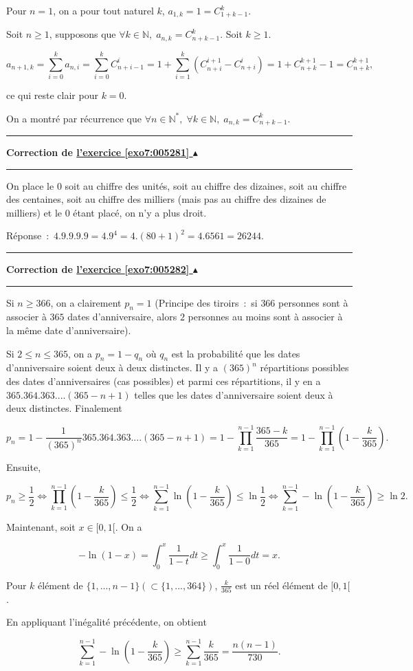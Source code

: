 \documentclass[11pt,a4paper]{article}
\newcommand{\Nn}{\mathbb{N}} \newcommand{\N}{\mathbb{N}}
\newcounter{exo}
\newcommand{\correction}[1]{\hypertarget{cor7:#1}{}\label{cor7:#1}{\bf Correction de \hyperlink{exo7:#1}{l'exercice \ref{exo7:#1} $\blacktriangle$}}\vspace{1mm}\hrule\vspace{1mm}}
\newcommand{\fincorrection}{\vspace{1mm}\hrule\vspace*{7mm}}
\begin{document}
Pour $n=1$, on a pour tout naturel $k$, $a_{1,k}=1=C_{1+k-1}^k$.

Soit $n\geq1$, supposons que $\forall k\in\Nn,\;a_{n,k}=C_{n+k-1}^k$. Soit $k\geq1$.

$$a_{n+1,k}=\sum_{i=0}^{k}a_{n,i}=\sum_{i=0}^{k}C_{n+i-1}^i=1+\sum_{i=1}^{k}(C_{n+i}^{i+1}-C_{n+i}^i)=1+C_{n+k}^{k+1}-1=
C_{n+k}^{k+1},$$

ce qui reste clair pour $k=0$.
 
On a montré par récurrence que $\forall n\in\Nn^*,\;\forall k\in\Nn,\;a_{n,k}=C_{n+k-1}^k$.
\fincorrection
\correction{005281}
On place le $0$ soit au chiffre des unités, soit au chiffre des dizaines, soit au chiffre des centaines, soit au chiffre des milliers (mais pas au chiffre des dizaines de milliers) et le $0$ étant placé, on n'y a plus droit.

Réponse~:~$4.9.9.9.9=4.9^4=4.(80+1)^2=4.6561=26244$.

\fincorrection
\correction{005282}
Si $n\geq366$, on a clairement $p_n=1$ (Principe des tiroirs~:~si $366$ personnes sont à associer à $365$ dates d'anniversaire, alors $2$ personnes au moins sont à associer à la même date d'anniversaire).

Si $2\leq n\leq 365$, on a $p_n=1-q_n$ où $q_n$ est la probabilité que les dates d'anniversaire soient deux à deux distinctes. Il y a $(365)^n$ répartitions possibles des dates d'anniversaires (cas possibles) et parmi ces répartitions, il y en a $365.364.363....(365-n+1)$ telles que les dates d'anniversaire soient deux à deux distinctes. Finalement 

$$p_n=1-\frac{1}{(365)^n}365.364.363....(365-n+1)=1-\prod_{k=1}^{n-1}\frac{365-k}{365}=1-\prod_{k=1}^{n-1}(1-\frac{k}{365}).$$

Ensuite,

$$p_n\geq\frac{1}{2}\Leftrightarrow\prod_{k=1}^{n-1}(1-\frac{k}{365})\leq\frac{1}{2}\Leftrightarrow\sum_{k=1}^{n-1}\ln(1-\frac{k}{365}) \leq\ln\frac{1}{2}\Leftrightarrow\sum_{k=1}^{n-1}-\ln(1-\frac{k}{365})\geq\ln2.$$

Maintenant, soit $x\in[0,1[$. On a

$$-\ln(1-x)=\int_{0}^{x}\frac{1}{1-t}dt\geq\int_{0}^{x}\frac{1}{1-0}dt=x.$$

Pour $k$ élément de $\{1,...,n-1\}(\subset\{1,...,364\})$, $\frac{k}{365}$ est un réel élément de $[0,1[$.

En appliquant l'inégalité précédente, on obtient 

$$\sum_{k=1}^{n-1}-\ln(1-\frac{k}{365})\geq\sum_{k=1}^{n-1}\frac{k}{365}=\frac{n(n-1)}{730}.$$
\end{document}
